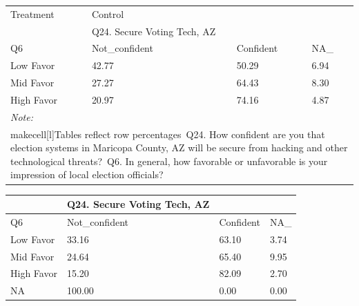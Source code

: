 \documentclass[
  11pt,
  a4paper,
]{article}
\begin{document}
\begin{table}
\centering
\centering
\begin{tabular}[t]{l|l|l|l}
\hline
\multicolumn{1}{l|}{Treatment} & \multicolumn{1}{l}{Control} \\
\cline{1-1} \cline{2-2}
 & Q24. Secure Voting Tech, AZ &  & \\
\hline
Q6 & Not\_confident & Confident & NA\_\\
\hline
Low Favor & 42.77 & 50.29 & 6.94\\
\hline
Mid Favor & 27.27 & 64.43 & 8.30\\
\hline
High Favor & 20.97 & 74.16 & 4.87\\
\hline
\multicolumn{4}{l}{\rule{0pt}{1em}\textit{Note: }}\\
\multicolumn{4}{l}{\rule{0pt}{1em}makecell[l]{Tables reflect row percentages\ Q24. How confident are you that election systems in Maricopa County, AZ will be secure from hacking and other technological threats?\ Q6. In general, how favorable or unfavorable is your impression of local election officials?}}\\
\end{tabular}
\centering
\begin{tabular}[t]{l|l|l|l}
\hline
 & Q24. Secure Voting Tech, AZ &  & \\
\hline
Q6 & Not\_confident & Confident & NA\_\\
\hline
Low Favor & 33.16 & 63.10 & 3.74\\
\hline
Mid Favor & 24.64 & 65.40 & 9.95\\
\hline
High Favor & 15.20 & 82.09 & 2.70\\
\hline
NA & 100.00 & 0.00 & 0.00\\
\hline
\end{tabular}
\end{table}
\end{document}
